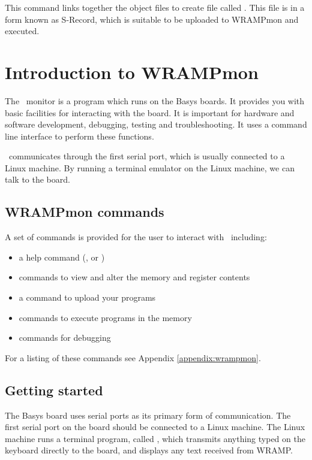 This command links together the object files to create file called
. This file is in a form known as S-Record, which
is suitable to be uploaded to WRAMPmon and executed.

%
%
%
\section{Introduction to WRAMPmon}
\label{intro:wrampmon}

The \WRAMPmon\ monitor is a program which runs on the Basys boards. It
provides you with basic facilities for interacting with the board.
It is important for hardware and software development, debugging,
testing and troubleshooting. It uses a command line interface to
perform these functions.

\WRAMPmon\ communicates through the first serial port, which is usually
connected to a Linux machine.
By running a terminal emulator on the Linux machine, we can talk to the board.

\subsection{WRAMPmon commands}
A set of commands is provided for the user to interact with \WRAMPmon\
including:

\begin{itemize}
\item a help command (, or )
\item commands to view and alter the memory and register contents
\item a command to upload your programs
\item commands to execute programs in the memory
\item commands for debugging
\end{itemize}

For a listing of these commands see Appendix \ref{appendix:wrampmon}.

\subsection{Getting started}
The Basys board uses serial ports as its primary form of communication.
The first serial port on the board should be connected to a Linux
machine. The Linux machine runs a terminal program, called
, which transmits anything typed on the keyboard
directly to the board, and displays any text received from WRAMP.

